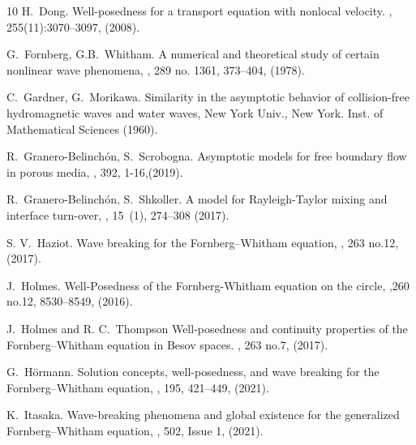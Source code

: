 \documentclass[final,11pt,a4paper,reqno]{amsart}
\theoremstyle{definition}
\begin{document}
\begin{footnotesize}
\begin{thebibliography}{10}
H.~Dong.
\newblock Well-posedness for a transport equation with nonlocal velocity.
, 255(11):3070--3097, (2008).



G.~Fornberg, G.B.~Whitham.
\newblock A numerical and theoretical study of certain nonlinear wave phenomena,
, 289
no. 1361, 373–404, (1978).

C.~Gardner, G.~Morikawa. 
\newblock Similarity in the asymptotic behavior of
  collision-free hydromagnetic waves and water waves, 
  New York Univ., New York. Inst. of Mathematical Sciences (1960).
  
  
  R.~Granero-Belinch{\'o}n, S.~Scrobogna. Asymptotic models for free boundary
  flow in porous media, 
  , 392, 1-16,(2019).
  
  R.~Granero-Belinch\'on, S.~Shkoller. A model for {R}ayleigh-{T}aylor mixing and
  interface turn-over,
  , 15~(1), 274--308 (2017).
  
    
 
S. V.~Haziot. 
\newblock Wave breaking for the Fornberg--Whitham equation,
, 263 no.12, (2017).

J.~Holmes.
\newblock Well-Posedness of the Fornberg-Whitham equation on the circle,
,260 no.12, 8530--8549, (2016).


J.~Holmes and R. C.~Thompson
\newblock Well-posedness and continuity properties of the Fornberg--Whitham equation in Besov spaces.
, 263 no.7, (2017).


G.~H\"ormann.
\newblock Solution concepts, well-posedness, and wave breaking for the Fornberg--Whitham equation,
, 195, 421--449, (2021).


K.~Itasaka. 
\newblock Wave-breaking phenomena and global existence for the generalized Fornberg--Whitham equation,
, 
502, Issue 1, (2021).




\end{thebibliography}
\end{footnotesize}
\end{document}
